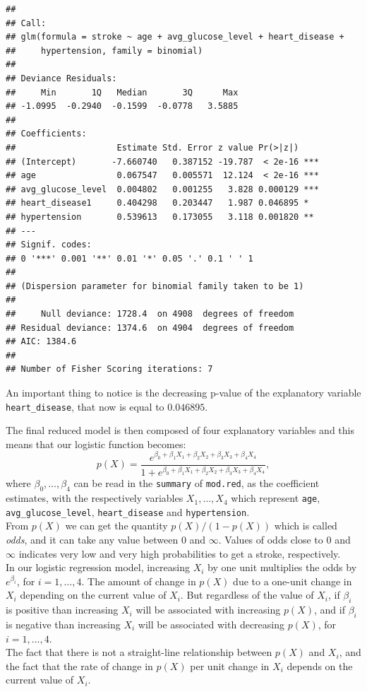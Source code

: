 \documentclass[
]{article}
\begin{document}
\begin{verbatim}
## 
## Call:
## glm(formula = stroke ~ age + avg_glucose_level + heart_disease + 
##     hypertension, family = binomial)
## 
## Deviance Residuals: 
##     Min       1Q   Median       3Q      Max  
## -1.0995  -0.2940  -0.1599  -0.0778   3.5885  
## 
## Coefficients:
##                    Estimate Std. Error z value Pr(>|z|)    
## (Intercept)       -7.660740   0.387152 -19.787  < 2e-16 ***
## age                0.067547   0.005571  12.124  < 2e-16 ***
## avg_glucose_level  0.004802   0.001255   3.828 0.000129 ***
## heart_disease1     0.404298   0.203447   1.987 0.046895 *  
## hypertension       0.539613   0.173055   3.118 0.001820 ** 
## ---
## Signif. codes:  
## 0 '***' 0.001 '**' 0.01 '*' 0.05 '.' 0.1 ' ' 1
## 
## (Dispersion parameter for binomial family taken to be 1)
## 
##     Null deviance: 1728.4  on 4908  degrees of freedom
## Residual deviance: 1374.6  on 4904  degrees of freedom
## AIC: 1384.6
## 
## Number of Fisher Scoring iterations: 7
\end{verbatim}

An important thing to notice is the decreasing p-value of the explanatory variable \texttt{heart\_disease}, that now is equal to \(0.046895\).

The final reduced model is then composed of four explanatory variables and this means that our logistic function becomes:
\[p(X)= \frac{e^{\beta_0+\beta_1X_1 + \beta_2X_2+\beta_3 X_3+\beta_4 X_4}}{1+e^{\beta_0+\beta_1X_1 + \beta_2X_2+\beta_3 X_3+\beta_4 X_4}},\]
where \(\beta_0, \dots, \beta_4\) can be read in the \texttt{summary} of
\texttt{mod.red}, as the coefficient estimates, with the respectively
variables \(X_1, \dots, X_4\) which represent \texttt{age},
\texttt{avg\_glucose\_level}, \texttt{heart\_disease} and
\texttt{hypertension}.\\
From \(p(X)\) we can get the quantity \(p(X)/(1-p(X))\) which is called
\emph{odds}, and it can take any value between \(0\) and \(\infty\).
Values of odds close to \(0\) and \(\infty\) indicates very low and very
high probabilities to get a stroke, respectively.\\
In our logistic regression model, increasing \(X_i\) by one unit
multiplies the odds by \(e^{\beta_i}\), for \(i=1, \dots, 4\). The
amount of change in \(p(X)\) due to a one-unit change in \(X_i\) depending
on the current value of \(X_i\). But regardless of the value of \(X_i\),
if \(\beta_i\) is positive than increasing \(X_i\) will be associated
with increasing \(p(X)\), and if \(\beta_i\) is negative than increasing
\(X_i\) will be associated with decreasing \(p(X)\), for
\(i=1, \dots, 4\).\\
The fact that there is not a straight-line relationship between \(p(X)\)
and \(X_i\), and the fact that the rate of change in \(p(X)\) per unit
change in \(X_i\) depends on the current value of \(X_i\).
\end{document}
